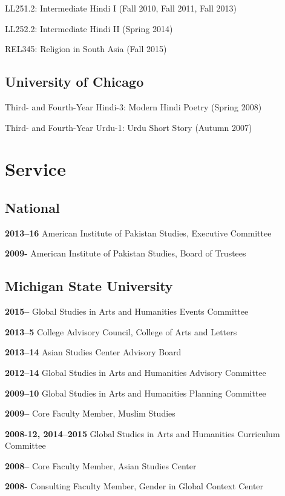 \documentclass[letterpaper,12pt]{article}
\begin{document}
LL251.2: Intermediate Hindi I (Fall 2010, Fall 2011, Fall 2013)

LL252.2: Intermediate Hindi II (Spring 2014)

REL345: Religion in South Asia (Fall 2015)


\subsection{University of Chicago%
  \label{university-of-chicago}%
}

Third- and Fourth-Year Hindi-3: Modern Hindi Poetry (Spring 2008)

Third- and Fourth-Year Urdu-1: Urdu Short Story (Autumn 2007)


\section{Service%
  \label{service}%
}


\subsection{National%
  \label{national}%
}

\textbf{2013–16}
American Institute of Pakistan Studies, Executive Committee

\textbf{2009-}
American Institute of Pakistan Studies, Board of Trustees


\subsection{Michigan State University%
  \label{id2}%
}

\textbf{2015–}
Global Studies in Arts and Humanities Events Committee

\textbf{2013–5}
College Advisory Council, College of Arts and Letters

\textbf{2013–14}
Asian Studies Center Advisory Board

\textbf{2012–14}
Global Studies in Arts and Humanities Advisory Committee

\textbf{2009–10}
Global Studies in Arts and Humanities Planning Committee

\textbf{2009–}
Core Faculty Member, Muslim Studies

\textbf{2008-12, 2014–2015}
Global Studies in Arts and Humanities Curriculum Committee

\textbf{2008–}
Core Faculty Member, Asian Studies Center

\textbf{2008-}
Consulting Faculty Member, Gender in Global Context Center
\end{document}
